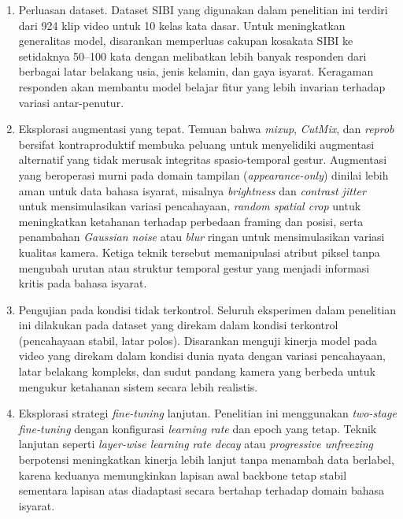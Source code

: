 \begin{enumerate}
  \item Perluasan dataset. Dataset SIBI yang digunakan dalam penelitian ini terdiri dari 924 klip video untuk 10 kelas kata dasar. Untuk meningkatkan generalitas model, disarankan memperluas cakupan kosakata SIBI ke setidaknya 50--100 kata dengan melibatkan lebih banyak responden dari berbagai latar belakang usia, jenis kelamin, dan gaya isyarat. Keragaman responden akan membantu model belajar fitur yang lebih invarian terhadap variasi antar-penutur.

  \item Eksplorasi augmentasi yang tepat. Temuan bahwa \textit{mixup}, \textit{CutMix}, dan \textit{reprob} bersifat kontraproduktif membuka peluang untuk menyelidiki augmentasi alternatif yang tidak merusak integritas spasio-temporal gestur. Augmentasi yang beroperasi murni pada domain tampilan (\textit{appearance-only}) dinilai lebih aman untuk data bahasa isyarat, misalnya \textit{brightness} dan \textit{contrast jitter} untuk mensimulasikan variasi pencahayaan, \textit{random spatial crop} untuk meningkatkan ketahanan terhadap perbedaan framing dan posisi, serta penambahan \textit{Gaussian noise} atau \textit{blur} ringan untuk mensimulasikan variasi kualitas kamera. Ketiga teknik tersebut memanipulasi atribut piksel tanpa mengubah urutan atau struktur temporal gestur yang menjadi informasi kritis pada bahasa isyarat.

  \item Pengujian pada kondisi tidak terkontrol. Seluruh eksperimen dalam penelitian ini dilakukan pada dataset yang direkam dalam kondisi terkontrol (pencahayaan stabil, latar polos). Disarankan menguji kinerja model pada video yang direkam dalam kondisi dunia nyata dengan variasi pencahayaan, latar belakang kompleks, dan sudut pandang kamera yang berbeda untuk mengukur ketahanan sistem secara lebih realistis.

  \item Eksplorasi strategi \textit{fine-tuning} lanjutan. Penelitian ini menggunakan \textit{two-stage fine-tuning} dengan konfigurasi \textit{learning rate} dan epoch yang tetap. Teknik lanjutan seperti \textit{layer-wise learning rate decay} atau \textit{progressive unfreezing} berpotensi meningkatkan kinerja lebih lanjut tanpa menambah data berlabel, karena keduanya memungkinkan lapisan awal backbone tetap stabil sementara lapisan atas diadaptasi secara bertahap terhadap domain bahasa isyarat.


\end{enumerate}
